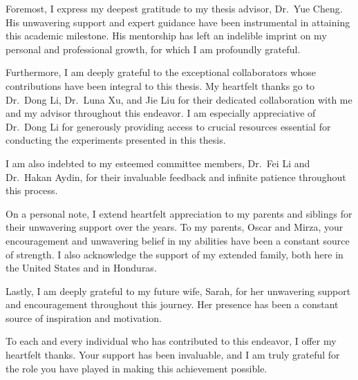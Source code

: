 \documentclass[11pt]{report}
\begin{document}

\acknowledgementspage

{
\setlength{\parskip}{1em}
\noindent Foremost, I express my deepest gratitude to my thesis advisor, Dr.~Yue Cheng. His unwavering support and expert guidance have been instrumental in attaining this academic milestone. His mentorship has left an indelible imprint on my personal and professional growth, for which I am profoundly grateful.

\noindent Furthermore, I am deeply grateful to the exceptional collaborators whose contributions have been integral to this thesis. My heartfelt thanks go to Dr.~Dong Li, Dr.~Luna Xu, and Jie Liu for their dedicated collaboration with me and my advisor throughout this endeavor. I am especially appreciative of Dr.~Dong Li for generously providing access to crucial resources essential for conducting the experiments presented in this thesis.

\noindent I am also indebted to my esteemed committee members, Dr.~Fei Li and Dr.~Hakan Aydin, for their invaluable feedback and infinite patience throughout this process.

\noindent On a personal note, I extend heartfelt appreciation to my parents and siblings for their unwavering support over the years. To my parents, Oscar and Mirza, your encouragement and unwavering belief in my abilities have been a constant source of strength. I also acknowledge the support of my extended family, both here in the United States and in Honduras.

\noindent Lastly, I am deeply grateful to my future wife, Sarah, for her unwavering support and encouragement throughout this journey. Her presence has been a constant source of inspiration and motivation.

\noindent To each and every individual who has contributed to this endeavor, I offer my heartfelt thanks. Your support has been invaluable, and I am truly grateful for the role you have played in making this achievement possible.
}
\end{document}
